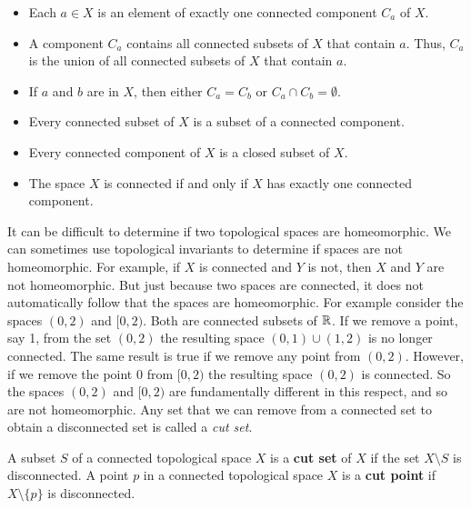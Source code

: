 \begin{itemize}
\item Each $a \in X$ is an element of exactly one connected component $C_a$ of $X$.
\item A component $C_a$ contains all connected subsets of $X$ that contain $a$. Thus, $C_a$ is the union of all connected subsets of $X$ that contain $a$. 
\item If $a$ and $b$ are in $X$, then either $C_a = C_b$ or $C_a \cap C_b = \emptyset$. 
\item Every connected subset of $X$ is a subset of a connected component.
\item Every connected component of $X$ is a closed subset of $X$. %
\item The space $X$ is connected if and only if $X$ has exactly one connected component.
\end{itemize}
 


\label{sec_cut_sets}

It can be difficult to determine if two topological spaces are homeomorphic. We can sometimes use topological invariants to determine if spaces are not homeomorphic. For example, if $X$ is connected and $Y$ is not, then $X$ and $Y$ are not homeomorphic. But just because two spaces are connected, it does not automatically follow that the spaces are homeomorphic. For example consider the spaces $(0,2)$ and $[0,2)$. Both are connected subsets of $\mathbb{R}$. If we remove a point, say 1, from the set $(0,2)$ the resulting space $(0,1) \cup (1,2)$ is no longer connected. The same result is true if we remove any point from $(0,2)$. However, if we remove the point $0$ from $[0,2)$ the resulting space $(0,2)$ is connected. So the spaces $(0,2)$ and $[0,2)$ are fundamentally different in this respect, and so are not homeomorphic. Any set that we can remove from a connected set to obtain a disconnected set is called a \emph{cut set}.

\begin{definition} A subset $S$ of a connected topological space $X$ is a \textbf{cut set} of $X$ if the set $X \setminus S$ is disconnected. A point $p$ in a connected topological space $X$ is a \textbf{cut point} if $X \setminus \{p\}$ is disconnected.
\end{definition}

